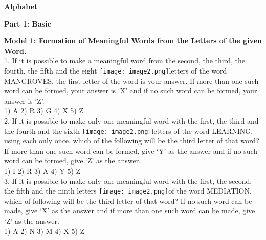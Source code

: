 \documentclass[
]{article}
\author{}
\date{}
\begin{document}
	
 

\begin{center}
	{\Large \textbf{Alphabet \\}}
\end{center}

{\large \textbf{ Part 1: Basic \\}}

\textbf{Model 1: Formation of Meaningful Words from the Letters of the given Word.}\\

1. If it is possible to make a meaningful word from the second, the third, the fourth, the fifth
and the eight \texttt{[image: image2.png]}letters of the word MANGROVES, the first letter of the word is your answer. If
more than one such word can be formed, your answer is ‘X’ and if no such word can be
formed, your answer is ‘Z’.\\
1) A \hspace{2mm}2) R \hspace{2mm}3) G \hspace{2mm}4) X \hspace{2mm}5) Z\\

2. If it is possible to make only one meaningful word with the first, the third and the fourth
and the sixth \texttt{[image: image2.png]}letters of the word LEARNING, using each only once, which of the following
will be the third letter of that word? If more than one such word can be formed, give ‘Y’ as
the answer and if no such word can be formed, give ‘Z’ as the answer.\\
1) I \hspace{2mm}2) R \hspace{2mm}3) A \hspace{2mm}4) Y \hspace{2mm}5) Z\\

3. If it is possible to make only one meaningful word with the first, the second, the fifth and
the ninth letters \texttt{[image: image2.png]}of the word MEDIATION, which of following will be the third letter of that
word? If no such word can be made, give ‘X’ as the answer and if more than one such word
can be made, give ‘Z’ as the answer.\\
1) A \hspace{2mm}2) N \hspace{2mm}3) M \hspace{2mm}4) X \hspace{2mm}5) Z\\
\end{document}
